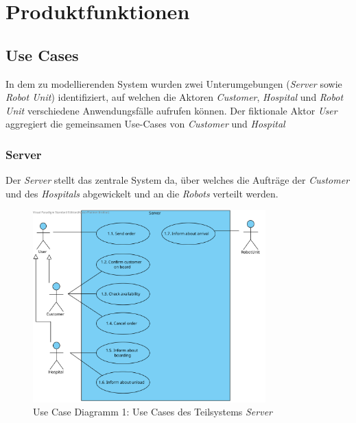\section{Produktfunktionen}

		\subsection{Use Cases}
		
		In dem zu modellierenden System wurden zwei Unterumgebungen (\emph{Server} sowie \emph{Robot Unit}) identifiziert, auf welchen die Aktoren \emph{Customer}, \emph{Hospital} und \emph{Robot Unit} verschiedene Anwendungsfälle aufrufen können. Der fiktionale Aktor \emph{User} aggregiert die gemeinsamen Use-Cases von \emph{Customer} und \emph{Hospital} \\
			\subsubsection{Server}
			Der \emph{Server} stellt das zentrale System da, über welches die Aufträge der \emph{Customer} und des \emph{Hospitals} abgewickelt und an die \emph{Robots} verteilt werden.
				\begin{figure}[H]
					\centering
					\includegraphics[width=0.8\textwidth]{img/2-Analyse-Server}
					\caption{Use Case Diagramm 1: Use Cases des Teilsystems \emph{Server}}
					\label{fig:3-1-server-use-cases}
				\end{figure}
			\pagebreak
